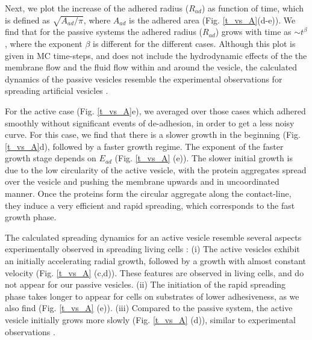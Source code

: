 \documentclass[pre,amsmath]{revtex4}
\begin{document}
Next, we  plot the increase of the adhered radius ($R_{ad}$) as function of time, which is defined as $\sqrt{A_{ad}/\pi}$, where $A_{ad}$ is the adhered area (Fig. \ref{t_vs_A}(d-e)). 
We find that for the passive systems the adhered radius ($R_{ad}$) grows with time as $\sim t^\beta$, where the exponent $\beta$ is different for the different cases. Although this plot is given in MC time-steps, and does not include the hydrodynamic effects of the the membrane flow and the fluid flow within and around the vesicle, the calculated dynamics of the passive vesicles resemble the experimental observations for spreading artificial vesicles \cite{streicher2009integrin}.

For the active case (Fig. \ref{t_vs_A}e), we averaged over those cases which adhered smoothly without significant events of de-adhesion, in order to get a less noisy curve. For this case, we find that there is a slower growth in the beginning (Fig. \ref{t_vs_A}d), followed by a faster growth regime. The exponent of the faster growth stage depends on $E_{ad}$ (Fig. \ref{t_vs_A} (e)). The slower initial growth is due to the low circularity of the active vesicle, with the protein aggregates spread over the vesicle and pushing the membrane upwards and in uncoordinated manner. Once the proteins form the circular aggregate along the contact-line, they induce a very efficient and rapid spreading, which corresponds to the fast growth phase.

The calculated spreading dynamics for an active vesicle resemble several aspects experimentally observed in spreading living cells \cite{Sheetz2004PRL,dubin2004nanometer,Sheetz2014}: (i) The active vesicles exhibit an initially accelerating radial growth, followed by a growth with almost constant velocity (Fig. \ref{t_vs_A} (c,d)). These features are observed in living cells, and do not appear for our passive vesicles. (ii) The initiation of the rapid spreading phase takes longer to appear for cells on substrates of lower adhesiveness, as we also find (Fig. \ref{t_vs_A} (e)). (iii) Compared to the passive system, the active vesicle initially grows more slowly (Fig. \ref{t_vs_A} (d)), similar to experimental observations \cite{cuvelier2007universal}. 
\end{document}
